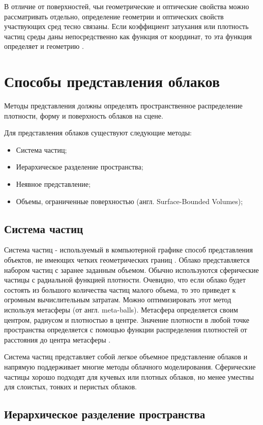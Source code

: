В отличие от поверхностей, чьи геометрические и оптические свойства можно рассматривать отдельно, определение геометрии и оптических свойств участвующих сред тесно связаны. Если коэффициент затухания или плотность частиц среды даны непосредственно как функция от координат, то эта функция определяет и геометрию \cite{partmedia}.  


\section{Способы представления облаков}
Методы представления должны определять пространственное распределение плотности, форму и поверхность облаков на сцене.

Для представления облаков существуют следующие методы:
\begin{itemize}
	\item Система частиц;
	\item Иерархическое разделение пространства;
	\item Неявное представление;
	\item Объемы, ограниченные поверхностью (англ. Surface-Bounded Volumes);
\end{itemize}

\subsection{Система частиц}
\label{particles}
Система частиц - используемый в компьютерной графике способ представления объектов, не имеющих четких геометрических границ \cite{particles1}. 
Облако представляется набором частиц с заранее заданным объемом. Обычно используются сферические частицы с радиальной функцией плотности. Очевидно, что если облако будет состоять из большого количества частиц малого объема, то это приведет к огромным вычислительным затратам. Можно оптимизировать этот метод используя метасферы (от англ. meta-balls). Метасфера определяется своим центром, радиусом и плотностью в центре. Значение плотности в любой точке пространства определяется с помощью функции распределения плотностей от расстояния до центра метасферы \cite{nishita}. 

Система частиц представляет собой легкое объемное представление облаков и напрямую поддерживает многие методы облачного моделирования. Сферические частицы хорошо подходят для кучевых или плотных облаков, но менее уместны для слоистых, тонких и перистых облаков.

\subsection{Иерархическое разделение пространства} 


